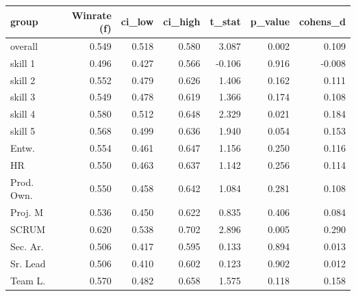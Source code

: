 \begin{tabular}{lrrrrrr}
\toprule
group & Winrate (f) & ci\_low & ci\_high & t\_stat & p\_value & cohens\_d \\
\midrule
overall & 0.549 & 0.518 & 0.580 & 3.087 & 0.002 & 0.109 \\
skill 1 & 0.496 & 0.427 & 0.566 & -0.106 & 0.916 & -0.008 \\
skill 2 & 0.552 & 0.479 & 0.626 & 1.406 & 0.162 & 0.111 \\
skill 3 & 0.549 & 0.478 & 0.619 & 1.366 & 0.174 & 0.108 \\
skill 4 & 0.580 & 0.512 & 0.648 & 2.329 & 0.021 & 0.184 \\
skill 5 & 0.568 & 0.499 & 0.636 & 1.940 & 0.054 & 0.153 \\
Entw. & 0.554 & 0.461 & 0.647 & 1.156 & 0.250 & 0.116 \\
HR & 0.550 & 0.463 & 0.637 & 1.142 & 0.256 & 0.114 \\
Prod. Own. & 0.550 & 0.458 & 0.642 & 1.084 & 0.281 & 0.108 \\
Proj. M & 0.536 & 0.450 & 0.622 & 0.835 & 0.406 & 0.084 \\
SCRUM & 0.620 & 0.538 & 0.702 & 2.896 & 0.005 & 0.290 \\
Sec. Ar. & 0.506 & 0.417 & 0.595 & 0.133 & 0.894 & 0.013 \\
Sr. Lead & 0.506 & 0.410 & 0.602 & 0.123 & 0.902 & 0.012 \\
Team L. & 0.570 & 0.482 & 0.658 & 1.575 & 0.118 & 0.158 \\
\bottomrule
\end{tabular}
